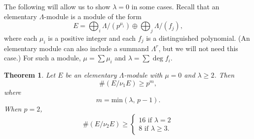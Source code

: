 \documentclass{amsart}
\newtheorem{theorem}{Theorem}
\begin{document}
The following will allow us to show $\lambda=0$ in some  cases. Recall that an elementary $\Lambda$-module
is a module of the form
$$
E=\bigoplus_i\Lambda/(p^{\mu_i})\oplus \bigoplus_j \Lambda/(f_j),
$$
where each $\mu_i$ is a positive integer and each $f_j$ is a distinguished polynomial. (An elementary module can also include a summand
$\Lambda^r$, but we will not need this case.) For such a module,
$\mu=\sum \mu_i$ and $\lambda=\sum \deg f_i$. 



\begin{theorem}\label{LambdaThm} Let $E$ be an elementary $\Lambda$-module with $\mu=0$ and $\lambda \ge 2$. Then
$$
\#(E/\nu_1 E)\ge p^m,
$$
where
$$
m = \text{min}(\lambda, \, p-1).
$$
When $p=2$,
$$
\#(E/\nu_2 E)\ge \begin{cases} 16 \text{ if } \lambda = 2\\ 8\text{ if } \lambda \ge 3.
\end{cases}
$$
\end{theorem}
\end{document}
